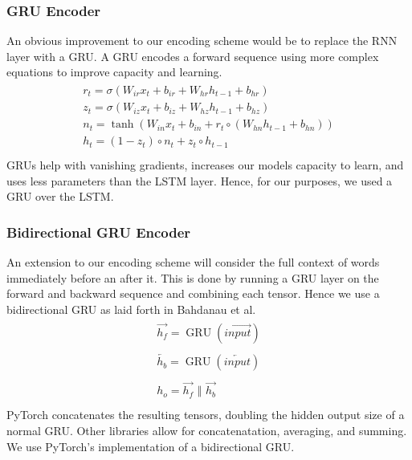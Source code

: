 \documentclass[twoside,twocolumn]{article}
\begin{document}
\subsubsection{GRU Encoder}
An obvious improvement to our encoding scheme would be to replace the RNN layer
with a GRU. A GRU encodes a forward sequence using more complex equations to
improve capacity and learning.
\begin{equation}
  \label{eq:gru}
  \begin{split}\begin{array}{ll}
    r_t = \sigma(W_{ir} x_t + b_{ir} + W_{hr} h_{t-1} + b_{hr}) \\
    z_t = \sigma(W_{iz} x_t + b_{iz} + W_{hz} h_{t-1} + b_{hz}) \\
    n_t = \tanh(W_{in} x_t + b_{in} + r_t \circ (W_{hn} h_{t-1}+ b_{hn})) \\
    h_t = (1 - z_t) \circ n_t + z_t \circ h_{t-1} \\
  \end{array}\end{split}
\end{equation}
GRUs help with vanishing gradients, increases our models capacity to learn,
and uses less parameters than the LSTM layer. Hence, for our purposes, we
used a GRU over the LSTM.

\subsubsection{Bidirectional GRU Encoder}
An extension to our encoding scheme will consider the full context of words
immediately before an after it. This is done by running a GRU layer on the
forward and backward sequence and combining each tensor. Hence we use a
bidirectional GRU as laid forth in Bahdanau et al. \cite{bahdanau2014neural}
\begin{equation}
  \label{eq:bidirectional}
  \begin{split}
    \begin{array}{ll}
      \overrightarrow{h_f} = \operatorname{GRU}(\overrightarrow{input})\\
      \\
      \overleftarrow{h_b} = \operatorname{GRU}(\overleftarrow{input})\\
      \\
      h_o = \overrightarrow{h_f} \,\,\Vert \,\, \overrightarrow{h_b}\\
    \end{array}
  \end{split}
\end{equation}
PyTorch concatenates the resulting tensors, doubling the hidden output size
of a normal GRU. Other libraries allow for concatenatation, averaging,
and summing. We use PyTorch's implementation of a bidirectional GRU.
\end{document}
